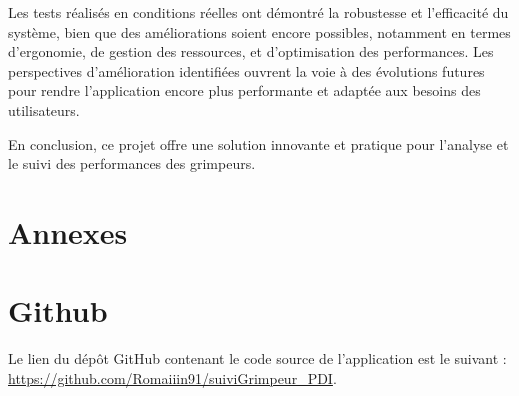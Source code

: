 \documentclass[a4paper, 11pt, french]{article}
\begin{document}
Les tests réalisés en conditions réelles ont démontré la robustesse et l'efficacité du système, bien que des améliorations soient encore possibles, notamment en termes d'ergonomie, de gestion des ressources, et d'optimisation des performances. Les perspectives d'amélioration identifiées ouvrent la voie à des évolutions futures pour rendre l'application encore plus performante et adaptée aux besoins des utilisateurs.

En conclusion, ce projet offre une solution innovante et pratique pour l'analyse et le suivi des performances des grimpeurs.



\clearpage
\newpage


\section*{Annexes}

\appendix

\startcontents[sections]


    \section{Github}
    Le lien du dépôt GitHub contenant le code source de l'application est le suivant : \url{https://github.com/Romaiiin91/suiviGrimpeur_PDI}.
      
\end{document}
